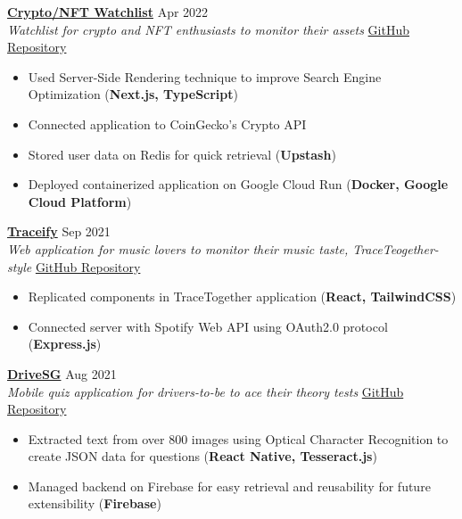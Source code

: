 \documentclass[a4paper]{article}
\begin{document}
\textbf{\href{https://crypto-docker-nypoewfveq-uc.a.run.app/}{Crypto/NFT Watchlist}} \hfill Apr 2022\\
\textit{Watchlist for crypto and NFT enthusiasts to monitor their assets} \hfill \href{https://github.com/jianrong7/crypto-ts}{GitHub Repository}\\
\vspace{-2mm}
\begin{itemize} \itemsep 1pt
    \item Used Server-Side Rendering technique to improve Search Engine Optimization (\textbf{Next.js, TypeScript})
    \item Connected application to CoinGecko's Crypto API
    \item Stored user data on Redis for quick retrieval (\textbf{Upstash})
    \item Deployed containerized application on Google Cloud Run (\textbf{Docker, Google Cloud Platform})
\end{itemize}

\textbf{\href{https://traceify-client.netlify.app/}{Traceify}} \hfill Sep 2021\\
\textit{Web application for music lovers to monitor their music taste, TraceTeogether-style} \hfill \href{https://github.com/jianrong7/traceify-client}{GitHub Repository}\\
\vspace{-2mm}
\begin{itemize} \itemsep 1pt
    \item Replicated components in TraceTogether application (\textbf{React, TailwindCSS})
    \item Connected server with Spotify Web API using OAuth2.0 protocol (\textbf{Express.js})
\end{itemize}

\textbf{\href{https://play.google.com/store/apps/details?id=com.jianrong7.drivesg}{DriveSG}} \hfill Aug 2021\\
\textit{Mobile quiz application for drivers-to-be to ace their theory tests} \hfill \href{https://github.com/jianrong7/drivesg}{GitHub Repository}\\
\vspace{-2mm}
\begin{itemize} \itemsep 1pt
    \item Extracted text from over 800 images using Optical Character Recognition to create JSON data for questions (\textbf{React Native, Tesseract.js})
    \item Managed backend on Firebase for easy retrieval and reusability for future extensibility (\textbf{Firebase})
\end{itemize}
\end{document}
